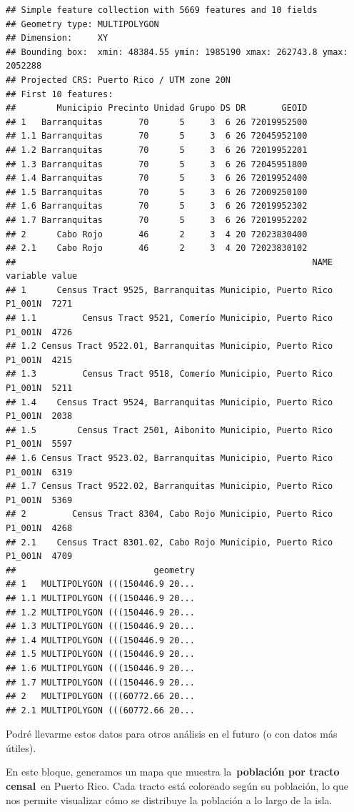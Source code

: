\documentclass[
]{article}
\begin{document}
\begin{verbatim}
## Simple feature collection with 5669 features and 10 fields
## Geometry type: MULTIPOLYGON
## Dimension:     XY
## Bounding box:  xmin: 48384.55 ymin: 1985190 xmax: 262743.8 ymax: 2052288
## Projected CRS: Puerto Rico / UTM zone 20N
## First 10 features:
##        Municipio Precinto Unidad Grupo DS DR       GEOID
## 1   Barranquitas       70      5     3  6 26 72019952500
## 1.1 Barranquitas       70      5     3  6 26 72045952100
## 1.2 Barranquitas       70      5     3  6 26 72019952201
## 1.3 Barranquitas       70      5     3  6 26 72045951800
## 1.4 Barranquitas       70      5     3  6 26 72019952400
## 1.5 Barranquitas       70      5     3  6 26 72009250100
## 1.6 Barranquitas       70      5     3  6 26 72019952302
## 1.7 Barranquitas       70      5     3  6 26 72019952202
## 2      Cabo Rojo       46      2     3  4 20 72023830400
## 2.1    Cabo Rojo       46      2     3  4 20 72023830102
##                                                          NAME variable value
## 1      Census Tract 9525, Barranquitas Municipio, Puerto Rico  P1_001N  7271
## 1.1         Census Tract 9521, Comerío Municipio, Puerto Rico  P1_001N  4726
## 1.2 Census Tract 9522.01, Barranquitas Municipio, Puerto Rico  P1_001N  4215
## 1.3         Census Tract 9518, Comerío Municipio, Puerto Rico  P1_001N  5211
## 1.4    Census Tract 9524, Barranquitas Municipio, Puerto Rico  P1_001N  2038
## 1.5        Census Tract 2501, Aibonito Municipio, Puerto Rico  P1_001N  5597
## 1.6 Census Tract 9523.02, Barranquitas Municipio, Puerto Rico  P1_001N  6319
## 1.7 Census Tract 9522.02, Barranquitas Municipio, Puerto Rico  P1_001N  5369
## 2         Census Tract 8304, Cabo Rojo Municipio, Puerto Rico  P1_001N  4268
## 2.1    Census Tract 8301.02, Cabo Rojo Municipio, Puerto Rico  P1_001N  4709
##                           geometry
## 1   MULTIPOLYGON (((150446.9 20...
## 1.1 MULTIPOLYGON (((150446.9 20...
## 1.2 MULTIPOLYGON (((150446.9 20...
## 1.3 MULTIPOLYGON (((150446.9 20...
## 1.4 MULTIPOLYGON (((150446.9 20...
## 1.5 MULTIPOLYGON (((150446.9 20...
## 1.6 MULTIPOLYGON (((150446.9 20...
## 1.7 MULTIPOLYGON (((150446.9 20...
## 2   MULTIPOLYGON (((60772.66 20...
## 2.1 MULTIPOLYGON (((60772.66 20...
\end{verbatim}

Podré llevarme estos datos para otros análisis en el futuro (o con datos
más útiles).

En este bloque, generamos un mapa que muestra la~\textbf{población por
tracto censal}~en Puerto Rico. Cada tracto está coloreado según su
población, lo que nos permite visualizar cómo se distribuye la población
a lo largo de la isla.
\end{document}
